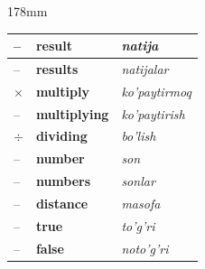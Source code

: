\documentclass[a4paper]{article}
\begin{document}
\begin{textblock*}{178mm}
{\begin{tabular}{|>{\centering\arraybackslash}p{22mm}|p{68mm}|p{72mm}|}
-- & \textbf{result} & \textit{natija} \\ \hline
\rowcolor{badge!18}
-- & \textbf{results} & \textit{natijalar} \\ \hline
$\times$ & \textbf{multiply} & \textit{ko'paytirmoq} \\ \hline
\rowcolor{badge!18}
-- & \textbf{multiplying} & \textit{ko'paytirish} \\ \hline
$\div$ & \textbf{dividing} & \textit{bo'lish} \\ \hline
\rowcolor{badge!18}
-- & \textbf{number} & \textit{son} \\ \hline
-- & \textbf{numbers} & \textit{sonlar} \\ \hline
\rowcolor{badge!18}
-- & \textbf{distance} & \textit{masofa} \\ \hline
-- & \textbf{true} & \textit{to'g'ri} \\ \hline
\rowcolor{badge!18}
-- & \textbf{false} & \textit{noto'g'ri} \\ \hline
\end{tabular}
}
\end{textblock*}
\end{document}
